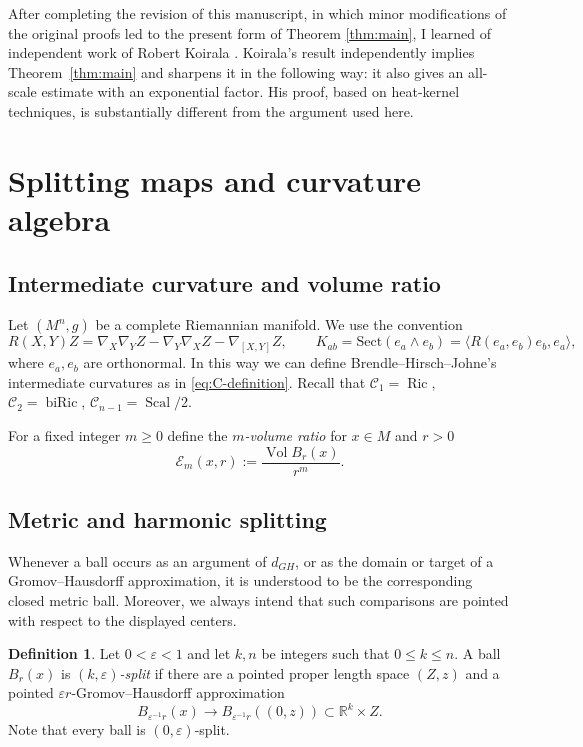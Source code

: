 \documentclass[11pt]{amsart}
\theoremstyle{definition}
\newtheorem{definition}[theorem]{Definition}
\theoremstyle{remark}
\DeclareMathOperator{\Ric}{Ric}
\DeclareMathOperator{\Scal}{Scal}
\DeclareMathOperator{\Vol}{Vol}
\newcommand{\R}{\mathbb R}
\newcommand{\eps}{\varepsilon}
\newcommand{\Cint}{\mathcal C}
\newcommand{\Ex}{\mathcal E}
\begin{document}
After completing the revision of this manuscript, in which minor
modifications of the original proofs led to the present form of Theorem
\ref{thm:main}, I learned of independent work of Robert Koirala
\cite[Theorem~1.1]{Koirala2026}. Koirala's result independently implies Theorem~\ref{thm:main} and sharpens it in the following way: it also gives an all-scale estimate with an exponential factor. His proof, based on heat-kernel techniques, is substantially different from the argument used here.

\section{Splitting maps and curvature algebra}

\subsection{Intermediate curvature and volume ratio}\label{sec:Inter}

Let $(M^n,g)$ be a complete Riemannian manifold. We use the convention
\[
 R(X,Y)Z=\nabla_X\nabla_YZ-\nabla_Y\nabla_XZ-\nabla_{[X,Y]}Z,
 \qquad K_{ab}=\mathrm{Sect}(e_a\wedge e_b) = \langle R(e_a,e_b)e_b,e_a\rangle,
\]
where $e_a,e_b$ are orthonormal. In this way we can define Brendle--Hirsch--Johne's intermediate curvatures as in \eqref{eq:C-definition}. Recall that $\Cint_1=\Ric$, $\Cint_2=\operatorname{biRic}$,
$\Cint_{n-1}=\Scal/2$.

For a fixed integer $m\geq 0$ define the \textit{$m$-volume ratio} for $x\in M$ and $r>0$
\begin{equation}\label{eq:excess}
                   \Ex_m(x,r):=\frac{\Vol B_r(x)}{r^m}.
\end{equation}

\subsection{Metric and harmonic splitting}
Whenever a ball occurs as an argument of $d_{GH}$, or as the
domain or target of a Gromov--Hausdorff approximation, it is
understood to be the corresponding closed metric ball. Moreover, we always intend that such
comparisons are pointed with respect to the displayed centers.

\begin{definition}\label{def:metric-split}
Let $0<\eps<1$ and let $k,n$ be integers such that $0\leq k\leq n$.  A ball $B_r(x)$ is
\emph{$(k,\eps)$-split} if there are a pointed proper length space
$(Z,z)$ and a pointed $\eps r$-Gromov--Hausdorff approximation
\[
 B_{\eps^{-1}r}(x)\longrightarrow
 B_{\eps^{-1}r}((0,z))\subset\R^k\times Z.
\]
Note that every ball is $(0,\eps)$-split.
\end{definition}
\end{document}
